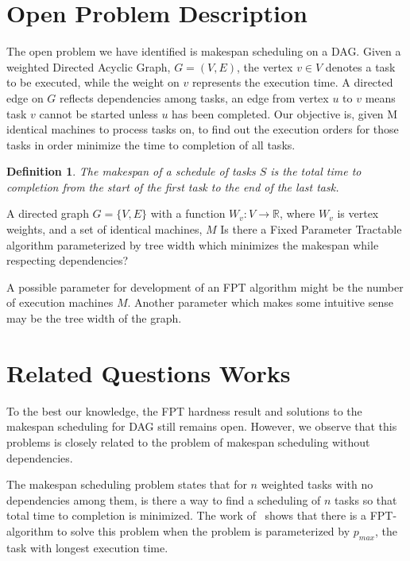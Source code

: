 \documentclass{article}
\newtheorem{definition}{Definition}
\begin{document}
\section{Open Problem Description}
The open problem we have identified is makespan scheduling on a DAG.
Given a weighted Directed Acyclic Graph, $G=(V,E)$, the vertex
$v \in V$ denotes a task to be executed, while the weight on $v$
represents the execution time. A directed edge on $G$ reflects
dependencies among tasks, an edge from vertex $u$ to $v$
means task $v$ cannot be started unless $u$ has been completed.
Our objective is, given M identical machines to process tasks on, to find out the execution
orders for those tasks in order minimize the time to completion of all tasks.


\begin{definition}
The \emph{makespan} of a schedule of tasks $S$ is the total time to completion
from the start of the first task to the end of the last task.
\end{definition}


%
{A directed graph $G = \{V, E\}$ with a function $W_v: V \to \mathbb{R}$,
 where $W_v$ is vertex weights, and a set of identical machines,
$M$}%
{}%
{Is there a Fixed Parameter Tractable algorithm parameterized by tree width
which  minimizes the makespan while respecting
dependencies?}%

A possible parameter for development of an FPT algorithm might be the number of
execution machines $M$. Another parameter which makes some intuitive sense may
be the tree width of the graph.

\section{Related Questions Works}
To the best our knowledge, the FPT hardness result and solutions to the
makespan scheduling for DAG still remains open.
However, we observe that this problems is closely related to the problem of
makespan scheduling without dependencies.

The makespan scheduling problem states that for $n$ weighted tasks with no
dependencies among them, is there a way to find a scheduling of $n$
tasks so that total time to completion is minimized. The work of~\cite{mnich2015scheduling}
shows that there is a FPT-algorithm to solve this problem
when the problem is parameterized by $p_{max}$, the task with longest
execution time.
\end{document}
